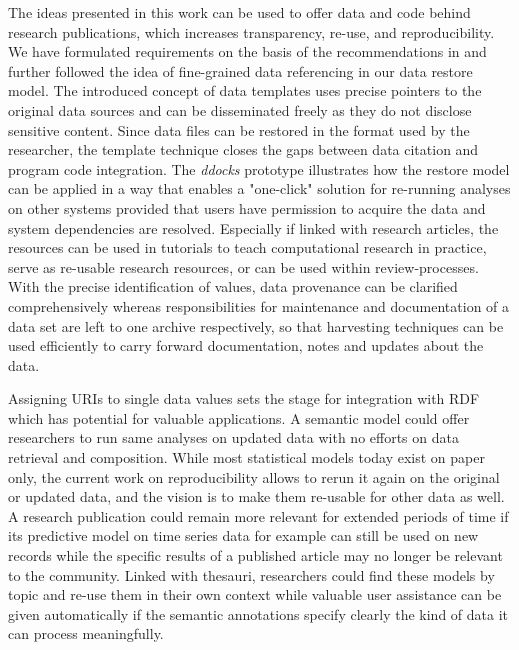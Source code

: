 \documentclass{sig-alternate}
\begin{document}
The ideas presented in this work can be used to offer data and code behind research publications, which increases transparency, re-use, and reproducibility.
We have formulated requirements on the basis of the recommendations in \cite{RePEc_ejw_journl_v_4_y_2007_i_3_p_326_337} and further followed the idea of fine-grained data referencing in our data restore model.
The introduced concept of data templates uses precise pointers to the original data sources and can be disseminated freely as they do not disclose sensitive content.
Since data files can be restored in the format used by the researcher, the template technique closes the gaps between data citation and program code integration.
The \textit{ddocks} prototype illustrates how the restore model can be applied in a way that enables a "one-click" solution for re-running analyses on other systems provided that users have permission to acquire the data and system dependencies are resolved.
Especially if linked with research articles, the resources can be used in tutorials to teach computational research in practice, serve as re-usable research resources, or can be used within review-processes.
With the precise identification of values, data provenance can be clarified comprehensively whereas responsibilities for maintenance and documentation of a data set are left to one archive respectively, so that harvesting techniques can be used efficiently to carry forward documentation, notes and updates about the data.



Assigning URIs to single data values sets the stage for integration with RDF which has potential for valuable applications.
A semantic model could offer researchers to run same analyses on updated data with no efforts on data retrieval and composition.
While most statistical models today exist on paper only, the current work on reproducibility allows to rerun it again on the original or updated data, and the vision is to make them re-usable for other data as well.
A research publication could remain more relevant for extended periods of time if its predictive model on time series data for example can still be used on new records while the specific results of a published article may no longer be relevant to the community.
Linked with thesauri, researchers could find these models by topic and re-use them in their own context while valuable user assistance can be given automatically if the semantic annotations specify clearly the kind of data it can process meaningfully.
\end{document}
